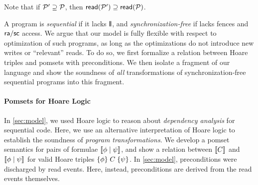 Note that if $\mathcal{P}'\supseteq\mathcal{P}$, then
${\mathsf{read}}(\mathcal{P}')\supseteq {\mathsf{read}}(\mathcal{P})$.


A program is \emph{sequential} if it lacks $\!\!\,\mathbin{\texttt{\textbf{|}}\mkern-6mu\texttt{\textbf{|}}}\,\!\!$, and
\emph{synchronization-free} if lacks fences and ${\mathsf{ra}}/{\mathsf{sc}}$ access.  We
argue that our model is fully flexible with respect to optimization of such
programs, as long as the optimizations do not introduce new writes or
``relevant'' reads.  To do so, we first formalize a
relation between Hoare triples and pomsets with preconditions.
We then isolate a fragment of our
language and show
the soundness of {\em all} transformations of synchronization-free sequential
programs into this fragment.

%
\paragraph{Pomsets for Hoare Logic}
In \textsection\ref{sec:model}, we used Hoare logic
\cite{Hoare:1969:ABC:363235.363259,gordonHoare} to reason about
\emph{dependency analysis} for sequential code.  Here, we use an alternative
interpretation of Hoare logic to establish the soundness of \emph{program
  transformations}.  We develop a pomset semantics for pairs of formulae
$\llbracket\phi\mid\psi\rrbracket$, and show a relation between $\llbracket C\rrbracket$ and
$\llbracket\phi\mid\psi\rrbracket$ for valid Hoare triples
$\{\phi\}\allowbreak\;C\;\allowbreak\{\psi\}$.  In \textsection\ref{sec:model},
preconditions were discharged by read events.  Here, instead, preconditions
are derived from the read events themselves.


